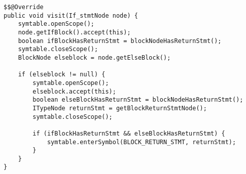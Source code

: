 \begin{lstlisting}[caption={If an return statement in an if else block is guaranteed, it is noted for the current scope.}, label={code:MISRE:ifstmt}]
$$@Override
public void visit(If_stmtNode node) {
    symtable.openScope();
    node.getIfBlock().accept(this);
    boolean ifBlockHasReturnStmt = blockNodeHasReturnStmt();
    symtable.closeScope();
    BlockNode elseblock = node.getElseBlock();
    
    if (elseblock != null) {
        symtable.openScope();
        elseblock.accept(this);
        boolean elseBlockHasReturnStmt = blockNodeHasReturnStmt();
        ITypeNode returnStmt = getBlockReturnStmtNode();
        symtable.closeScope();

        if (ifBlockHasReturnStmt && elseBlockHasReturnStmt) {
            symtable.enterSymbol(BLOCK_RETURN_STMT, returnStmt);
        }
    }
}
\end{lstlisting}